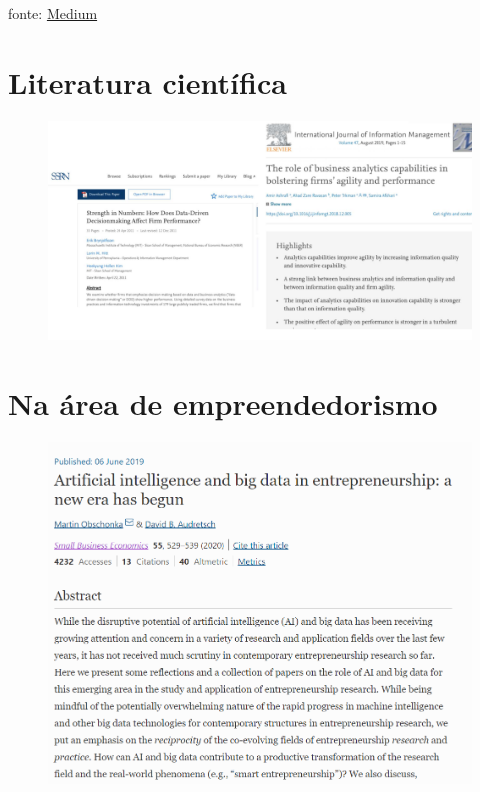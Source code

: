 \documentclass[
]{article}
\begin{document}
fonte:
\href{https://medium.com/somos-tera/data-literacy-o-que-\%C3\%A9-a-alfabetiza\%C3\%A7\%C3\%A3o-de-dados-e-porque-ela-\%C3\%A9-t\%C3\%A3o-importante-para-sua-empresa-951fcc5bcc67}{Medium}

\hypertarget{literatura-cientuxedfica}{%
\section{Literatura científica}\label{literatura-cientuxedfica}}

\begin{figure}

{\centering \includegraphics[width=1\linewidth,height=1\textheight]{imagem/analytics-capabilities} 

}

\caption{ }\label{fig:artigos, figures-side}
\end{figure}

\hypertarget{na-uxe1rea-de-empreendedorismo}{%
\section{Na área de
empreendedorismo}\label{na-uxe1rea-de-empreendedorismo}}

\begin{figure}

{\centering \includegraphics[width=0.8\linewidth,height=0.8\textheight]{imagem/sbe} 

}

\caption{ }\label{fig:sbe, figures-side}
\end{figure}
\end{document}
